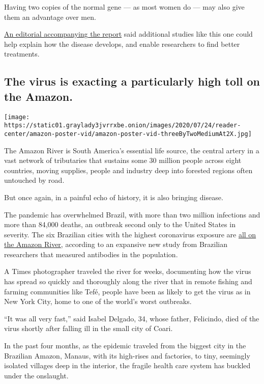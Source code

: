 Having two copies of the normal gene --- as most women do --- may also
give them an advantage over men.

\href{https://jamanetwork.com/journals/jama/fullarticle/2768925}{An
editorial accompanying the report} said additional studies like this one
could help explain how the disease develops, and enable researchers to
find better treatments.

\hypertarget{the-virus-is-exacting-a-particularly-high-toll-on-the-amazon}{%
\subsection{The virus is exacting a particularly high toll on the
Amazon.}\label{the-virus-is-exacting-a-particularly-high-toll-on-the-amazon}}

\texttt{[image: https://static01.graylady3jvrrxbe.onion/images/2020/07/24/reader-center/amazon-poster-vid/amazon-poster-vid-threeByTwoMediumAt2X.jpg]}

The Amazon River is South America's essential life source, the central
artery in a vast network of tributaries that sustains some 30 million
people across eight countries, moving supplies, people and industry deep
into forested regions often untouched by road.

But once again, in a painful echo of history, it is also bringing
disease.

The pandemic has overwhelmed Brazil, with more than two million
infections and more than 84,000 deaths, an outbreak second only to the
United States in severity. The six Brazilian cities with the highest
coronavirus exposure are
\href{https://www.medrxiv.org/content/10.1101/2020.05.30.20117531v1}{all
on the Amazon River,} according to an expansive new study from Brazilian
researchers that measured antibodies in the population.

A Times photographer traveled the river for weeks, documenting how the
virus has spread so quickly and thoroughly along the river that in
remote fishing and farming communities like Tefé, people have been as
likely to get the virus as in New York City, home to one of the world's
worst outbreaks.

``It was all very fast,'' said Isabel Delgado, 34, whose father,
Felicindo, died of the virus shortly after falling ill in the small city
of Coari.

In the past four months, as the epidemic traveled from the biggest city
in the Brazilian Amazon, Manaus, with its high-rises and factories, to
tiny, seemingly isolated villages deep in the interior, the fragile
health care system has buckled under the onslaught.

